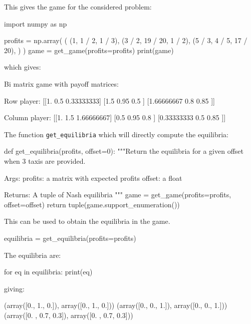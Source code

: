 This gives the game for the considered problem:

\begin{pyin}
import numpy as np

profits = np.array(
    (
        (1, 1 / 2, 1 / 3),
        (3 / 2, 19 / 20, 1 / 2),
        (5 / 3, 4 / 5, 17 / 20),
    )
)
game = get_game(profits=profits)
print(game)
\end{pyin}

which gives:

\begin{pyout}
Bi matrix game with payoff matrices:

Row player:
[[1.         0.5        0.33333333]
 [1.5        0.95       0.5       ]
 [1.66666667 0.8        0.85      ]]

Column player:
[[1.         1.5        1.66666667]
 [0.5        0.95       0.8       ]
 [0.33333333 0.5        0.85      ]]
\end{pyout}

The function \texttt{get_equilibria} which will directly compute the
equilibria:

\begin{pyin}
def get_equilibria(profits, offset=0):
    """Return the equilibria for a given offset when 3 taxis are
    provided.

    Args:
        profits: a matrix with expected profits
        offset: a float

    Returns:
        A tuple of Nash equilibria
    """
    game = get_game(profits=profits, offset=offset)
    return tuple(game.support_enumeration())
\end{pyin}

This can be used to obtain the equilibria in the game.

\begin{pyin}
equilibria = get_equilibria(profits=profits)
\end{pyin}

The equilibria are:

\begin{pyin}
for eq in equilibria:
    print(eq)
\end{pyin}

giving:

\begin{pyout}
(array([0., 1., 0.]), array([0., 1., 0.]))
(array([0., 0., 1.]), array([0., 0., 1.]))
(array([0. , 0.7, 0.3]), array([0. , 0.7, 0.3]))
\end{pyout}

